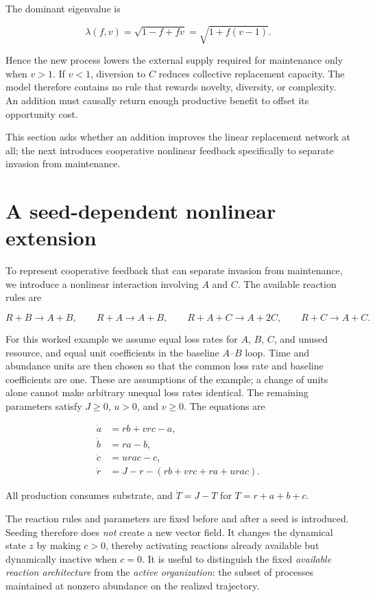 \documentclass[11pt,a4paper]{article}
\begin{document}
The dominant eigenvalue is

\[
\lambda(f,v)
=
\sqrt{1-f+fv}
=
\sqrt{1+f(v-1)}.
\]

Hence the new process lowers the external supply required for maintenance only when $v>1$. If $v<1$, diversion to $C$ reduces collective replacement capacity. The model therefore contains no rule that rewards novelty, diversity, or complexity. An addition must causally return enough productive benefit to offset its opportunity cost.

This section asks whether an addition improves the linear replacement network at all; the next introduces cooperative nonlinear feedback specifically to separate invasion from maintenance.

\section{A seed-dependent nonlinear extension}

To represent cooperative feedback that can separate invasion from maintenance, we introduce a nonlinear interaction involving $A$ and $C$. The available reaction rules are

\[
R+B\to A+B,
\qquad
R+A\to A+B,
\qquad
R+A+C\to A+2C,
\qquad
R+C\to A+C.
\]

For this worked example we assume equal loss rates for $A$, $B$, $C$, and unused resource, and equal unit coefficients in the baseline $A$--$B$ loop. Time and abundance units are then chosen so that the common loss rate and baseline coefficients are one. These are assumptions of the example; a change of units alone cannot make arbitrary unequal loss rates identical. The remaining parameters satisfy $J\ge0$, $u>0$, and $v\ge0$. The equations are

\begin{align}
\dot a &= rb+vrc-a, \label{eq:nonlinear-a}\\
\dot b &= ra-b, \label{eq:nonlinear-b}\\
\dot c &= urac-c, \label{eq:nonlinear-c}\\
\dot r &= J-r-(rb+vrc+ra+urac). \label{eq:nonlinear-r}
\end{align}

All production consumes substrate, and $\dot T=J-T$ for $T=r+a+b+c$.

The reaction rules and parameters are fixed before and after a seed is introduced. Seeding therefore does \emph{not} create a new vector field. It changes the dynamical state $z$ by making $c>0$, thereby activating reactions already available but dynamically inactive when $c=0$. It is useful to distinguish the fixed \emph{available reaction architecture} from the \emph{active organization}: the subset of processes maintained at nonzero abundance on the realized trajectory.
\end{document}
